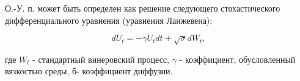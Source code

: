 \documentclass[10pt]{article}
\begin{document}
О.-У. п. может быть определен как решение следующего стохастического дифференциального уравнения (уравнения Ланжевена):



\[

d U_{t}=-\gamma U_{t} d t+\sqrt{\sigma} d W_{t},

\]



где $W_{t}$ - стандартный винеровский процесс, $\gamma$ - коэффициент, обусловленный вязкостью среды, б- коэффициент диффузии.
\end{document}
